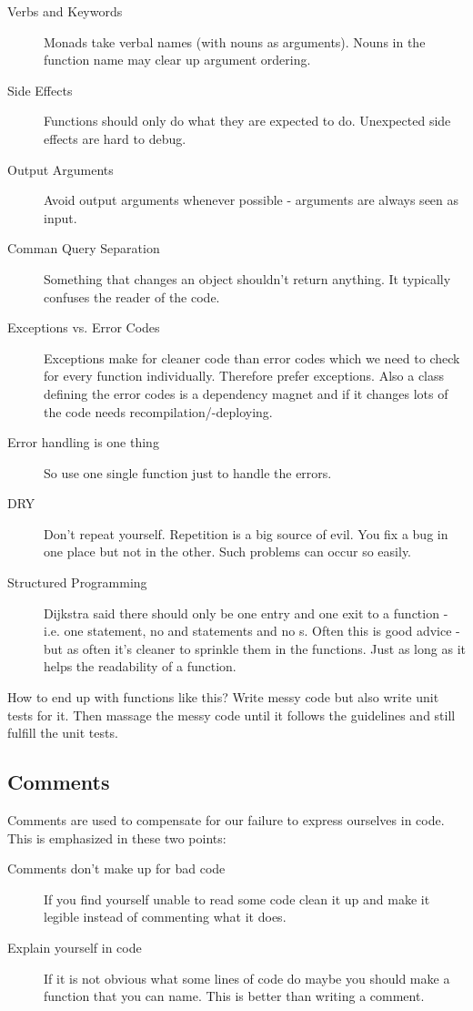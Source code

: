 \documentclass[a4paper, twocolumn]{article}
\newcommand{\code}[1]{\texttt{\color{black}{#1}}}
\begin{document}
\begin{description}
	\item[Verbs and Keywords] Monads take verbal names (with nouns as arguments). Nouns in the function name may clear up argument ordering.
	\item[Side Effects] Functions should only do what they are expected to do. Unexpected side effects are hard to debug.
	\item[Output Arguments] Avoid output arguments whenever possible - arguments are always seen as input.
	\item[Comman Query Separation] Something that changes an object shouldn't return anything. It typically confuses the reader of the code.
	\item[Exceptions vs. Error Codes] Exceptions make for cleaner code than error codes which we need to check for every function individually. Therefore prefer exceptions. Also a class defining the error codes is a dependency magnet and if it changes lots of the code needs recompilation/-deploying.
	\item[Error handling is one thing] So use one single function just to handle the errors.
	\item[DRY] Don't repeat yourself. Repetition is a big source of evil. You fix a bug in one place but not in the other. Such problems can occur so easily.
	\item[Structured Programming] Dijkstra said there should only be one entry and one exit to a function - i.e. one \code{return} statement, no \code{break} and \code{continue} statements and no \code{goto}s. Often this is good advice - but as often it's cleaner to sprinkle them in the functions. Just as long as it helps the readability of a function.
\end{description}
How to end up with functions like this? Write messy code but also write unit tests for it. Then massage the messy code until it follows the guidelines and still fulfill the unit tests.

\subsection{Comments}
Comments are used to compensate for our failure to express ourselves in code. This is emphasized in these two points:
\begin{description}
	\item[Comments don't make up for bad code] If you find yourself unable to read some code clean it up and make it legible instead of commenting what it does.
	\item[Explain yourself in code] If it is not obvious what some lines of code do maybe you should make a function that you can name. This is better than writing a comment.
\end{description}
\end{document}
